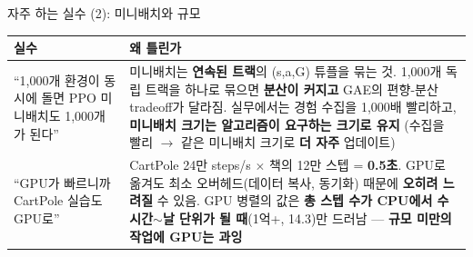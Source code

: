\documentclass[aspectratio=169,11pt]{beamer}
\begin{document}
\begin{frame}{자주 하는 실수 (2): 미니배치와 규모}
  \small
  \begin{tabular}{@{}p{4.6cm}p{9.4cm}@{}}
    \toprule
    실수 & 왜 틀린가 \\
    \midrule
    ``1,000개 환경이 동시에 돌면 PPO 미니배치도 1,000개가
      된다'' & 미니배치는 \textbf{연속된 트랙}의 (s,a,G) 튜플을
      묶는 것. 1,000개 독립 트랙을 하나로 묶으면 \textbf{분산이
      커지고} GAE의 편향-분산 tradeoff가 달라짐. 실무에서는
      경험 수집을 1,000배 빨리하고, \textbf{미니배치 크기는
      알고리즘이 요구하는 크기로 유지} (수집을 빨리 $\to$
      같은 미니배치 크기로 \textbf{더 자주} 업데이트) \\
    ``GPU가 빠르니까 CartPole 실습도 GPU로'' & CartPole 24만
      steps/s $\times$ 책의 12만 스텝 = \textbf{0.5초}. GPU로
      옮겨도 최소 오버헤드(데이터 복사, 동기화) 때문에 \textbf{오히려
      느려질} 수 있음. GPU 병렬의 값은 \textbf{총 스텝 수가 CPU에서
      수 시간$\sim$날 단위가 될 때}(1억+, 14.3)만 드러남 ---
      \textbf{규모 미만의 작업에 GPU는 과잉} \\
    \bottomrule
  \end{tabular}
\end{frame}

\end{document}
